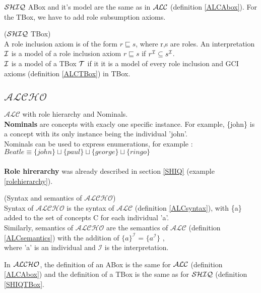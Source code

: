 $\mathcal{SHIQ}$ ABox and it's model are the same as in $\mathcal{ALC}$ (definition \ref{ALCAbox}). For the TBox, we have to add role subsumption axioms. 

\begin{mydef} \label{SHIQTBox} \cite{handbook} ($\mathcal{SHIQ}$ TBox) \\
A role inclusion axiom is of the form $r \sqsubseteq s$, where r,s
are roles. An interpretation $\mathcal{I}$ is a model of a role inclusion axiom  $r \sqsubseteq s$ if $r^{\mathcal{I}} \subseteq s^{\mathcal{I}}$.\\
$\mathcal{I}$ is a model of a TBox $\mathcal{T}$ if it it is a model of every role inclusion and GCI axioms (definition \ref{ALCTBox}) in TBox.
\end{mydef}





\subsection{$\mathcal{ALCHO}$}
$\mathcal{ALC}$ with role hierarchy and Nominals.\\
\textbf{Nominals} are concepts with exacly one specific instance. For example, \{john\} is a concept with its only instance being the individual 'john'. \\
Nominals can be used to express enumerations, for example \cite{primer}: \\
   $Beatle \equiv \{john\} \sqcup  \{paul\} \sqcup  \{george\} \sqcup  \{ringo\} $\\
\\
\textbf{Role hirerarchy} was already described in section \ref{SHIQ} (example \ref{rolehierarchy}).
\begin{mydef} (Syntax and semantics of $\mathcal{ALCHO}$)\\
	Syntax of $\mathcal{ALCHO}$ is the syntax of $\mathcal{ALC}$ (definition \ref{ALCsyntax}), with \{a\} added to the set of concepts C for each individual 'a'.\\
	Similarly, semantics of $\mathcal{ALCHO}$ are the semantics of $\mathcal{ALC}$ (definition \ref{ALCsemantics}) with the addition of 
     $\{a\}^\mathcal{I}$ = $ \{ a^\mathcal{I} \} $ ,\\ 
     where 'a' is an individual and $ \mathcal{I}$ is the interpretation. \\
\end{mydef}
In $\mathcal{ALCHO}$, the definition of an ABox is the same for $\mathcal{ALC}$ (definition \ref{ALCAbox}) and the definition of a TBox is the same as for $\mathcal{SHIQ}$ (definition \ref{SHIQTBox}.
